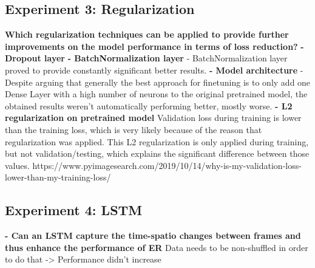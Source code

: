 \subsection{Experiment 3: Regularization}
\textbf{Which regularization techniques can be applied to provide further improvements on the model performance in terms of loss reduction?}
\textbf{- Dropout layer}
\newline\newline
\textbf{- BatchNormalization layer}\newline
- BatchNormalization layer proved to provide constantly significant better results.
\newline\newline
\textbf{- Model architecture}\newline
- Despite \citet{Pittaras:2017:FineTuningStrategiesComparison} arguing that generally the best approach for finetuning is to only add one Dense Layer with a high number of neurons to the original pretrained model, the obtained results weren't automatically performing better, mostly worse.
\newline\newline
\textbf{- L2 regularization on pretrained model}\newline
Validation loss during training is lower than the training loss, which is very likely because of the reason that regularization was applied. This L2 regularization is only applied during training, but not validation/testing, which explains the significant difference between those values.
https://www.pyimagesearch.com/2019/10/14/why-is-my-validation-loss-lower-than-my-training-loss/

\subsection{Experiment 4: LSTM}
\textbf{- Can an LSTM capture the time-spatio changes between frames and thus enhance the performance of \gls{ER}}
Data needs to be non-shuffled in order to do that
-> Performance didn't increase



